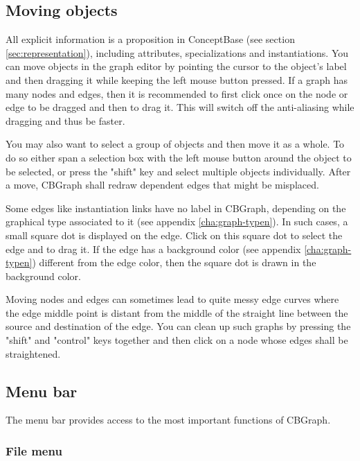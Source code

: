 \subsection{Moving objects}
\label{sec:moveobj}

All explicit information is a proposition in ConceptBase (see section \ref{sec:representation}),
including attributes,
specializations and instantiations. You can move objects in the graph 
editor by pointing the cursor to the object's label and then dragging it
while keeping the left mouse button pressed. 
If a graph has many nodes and edges, then it is recommended to first click
once on the node or edge to be dragged and then to drag it. This will
switch off the anti-aliasing while dragging and thus be faster. 

You may also want to select a group of objects and then move it as a
whole. To do so either span a selection box with the left mouse button around the
object to be selected, or press the "shift" key and select multiple objects
individually.
After a move, CBGraph shall redraw dependent edges that might be misplaced.

Some edges like instantiation links have no label in CBGraph,
depending on the graphical type associated to it (see appendix
\ref{cha:graph-typen}). In such cases, a small square dot is displayed 
on the edge. Click on this square dot to select the edge and to drag it.
If the edge has a background color (see appendix \ref{cha:graph-typen}) different from
the edge color, then the square dot is drawn in the background color. 

Moving nodes and edges can sometimes lead to quite messy edge curves where
the edge middle point is distant from the middle of the straight line
between the source and destination of the edge. You can clean up such graphs
by pressing the "shift" and "control" keys together and then click on a
node whose edges shall be straightened. 







\subsection{Menu bar}

The menu bar provides access to the most important functions
of CBGraph.

\subsubsection{File menu}

